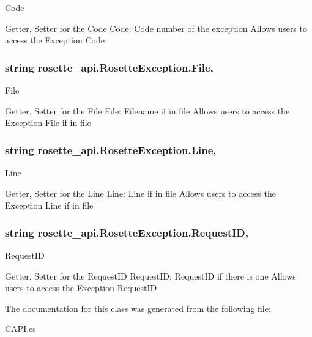 Code 

Getter, Setter for the Code Code\+: Code number of the exception Allows users to access the Exception Code \hypertarget{classrosette__api_1_1_rosette_exception_a060ff0690a35a0afbe15ecebe892a5a7}{}
\subsubsection[{File}]{\setlength{\rightskip}{0pt plus 5cm}string rosette\+\_\+api.\+Rosette\+Exception.\+File\hspace{0.3cm}{\ttfamily [get]}, {\ttfamily [set]}}\label{classrosette__api_1_1_rosette_exception_a060ff0690a35a0afbe15ecebe892a5a7}


File 

Getter, Setter for the File File\+: Filename if in file Allows users to access the Exception File if in file \hypertarget{classrosette__api_1_1_rosette_exception_a30a50a43d7edb20f3176ae4f048fa976}{}
\subsubsection[{Line}]{\setlength{\rightskip}{0pt plus 5cm}string rosette\+\_\+api.\+Rosette\+Exception.\+Line\hspace{0.3cm}{\ttfamily [get]}, {\ttfamily [set]}}\label{classrosette__api_1_1_rosette_exception_a30a50a43d7edb20f3176ae4f048fa976}


Line 

Getter, Setter for the Line Line\+: Line if in file Allows users to access the Exception Line if in file \hypertarget{classrosette__api_1_1_rosette_exception_a124d4746ae63df0352290ac841019163}{}
\subsubsection[{Request\+I\+D}]{\setlength{\rightskip}{0pt plus 5cm}string rosette\+\_\+api.\+Rosette\+Exception.\+Request\+I\+D\hspace{0.3cm}{\ttfamily [get]}, {\ttfamily [set]}}\label{classrosette__api_1_1_rosette_exception_a124d4746ae63df0352290ac841019163}


Request\+I\+D 

Getter, Setter for the Request\+I\+D Request\+I\+D\+: Request\+I\+D if there is one Allows users to access the Exception Request\+I\+D 

The documentation for this class was generated from the following file\+:\begin{DoxyCompactItemize}
\item 
C\+A\+P\+I.\+cs\end{DoxyCompactItemize}
